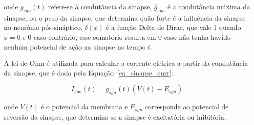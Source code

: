 onde $g_{syn}(t)$ refere-se à condutância da sinapse, $\bar{g}_{syn}$ é a condutância máxima da sinapse, ou o peso da sinapse, que
determina quão forte é a influência da sinapse no neurônio pós-sináptico, $\delta(x)$ é a função Delta de Dirac, que vale 1 quando
$x=0$ e 0 caso contrário, esse somatório resulta em 0 caso não tenha havido nenhum potencial de ação na sinapse no tempo $t$.

A lei de Ohm é utilizada para calcular a corrente elétrica a partir da condutância da sinapse, que é dada pela
Equação~\ref{eq_sinapse_curr}:

\begin{equation}
\label{eq_sinapse_curr}
I_{syn}(t)=g_{syn}(t)(V(t)-E_{syn})
\end{equation}

onde $V(t)$ é o potencial da membrana e $E_{syn}$ corresponde ao potencial de reversão da sinapse, que determina se a sinapse é
excitatória ou inibitória.


